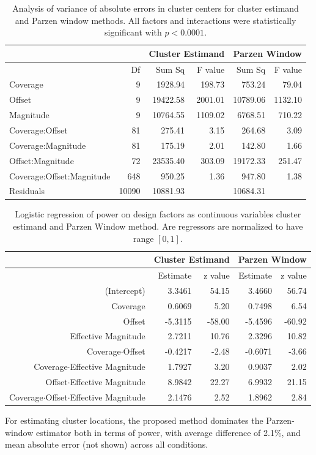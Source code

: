 \begin{table}
\centering{}%
\begin{tabular}{lr|rr|rr}
\hline 
 &  & \multicolumn{2}{c|}{Cluster Estimand} & \multicolumn{2}{c}{Parzen Window}\tabularnewline
\hline 
 & Df  & Sum Sq  & F value  & Sum Sq  & F value \tabularnewline
\hline 
Coverage & 9  & 1928.94  & 198.73  & 753.24  & 79.04 \tabularnewline
Offset  & 9  & 19422.58  & 2001.01  & 10789.06  & 1132.10 \tabularnewline
Magnitude  & 9  & 10764.55  & 1109.02 & 6768.51  & 710.22 \tabularnewline
Coverage:Offset  & 81  & 275.41  & 3.15 & 264.68  & 3.09 \tabularnewline
Coverage:Magnitude  & 81  & 175.19  & 2.01 & 142.80  & 1.66 \tabularnewline
Offset:Magnitude  & 72  & 23535.40  & 303.09 & 19172.33  & 251.47 \tabularnewline
Coverage:Offset:Magnitude  & 648  & 950.25  & 1.36  & 947.80  & 1.38 \tabularnewline
Residuals  & 10090  & 10881.93  &  & 10684.31  & \tabularnewline
\hline 
\end{tabular}\caption{Analysis of variance of absolute errors in cluster centers for cluster
estimand and Parzen window methods. All factors and interactions were
statistically significant with $p<0.0001$.
\label{tab:clusterAnova}}
\end{table}
%
\begin{table}[ht]
\centering{}%
\begin{tabular}{r|rr|rr}
\hline 
 & \multicolumn{2}{c|}{Cluster Estimand} & \multicolumn{2}{c}{Parzen Window}\tabularnewline
\hline 
 & Estimate  & z value  & Estimate  & z value \tabularnewline
\hline 
(Intercept)  & 3.3461  & 54.15  & 3.4660  & 56.74 \tabularnewline
Coverage & 0.6069  & 5.20  & 0.7498  & 6.54 \tabularnewline
Offset  & -5.3115  & -58.00  & -5.4596  & -60.92 \tabularnewline
Effective Magnitude  & 2.7211  & 10.76  & 2.3296  & 10.82 \tabularnewline
Coverage$\cdot$Offset  & -0.4217  & -2.48  & -0.6071  & -3.66 \tabularnewline
Coverage$\cdot$Effective Magnitude  & 1.7927  & 3.20  & 0.9037  & 2.02 \tabularnewline
Offset$\cdot$Effective Magnitude  & 8.9842  & 22.27  & 6.9932  & 21.15 \tabularnewline
Coverage$\cdot$Offset$\cdot$Effective Magnitude  & 2.1476  & 2.52  & 1.8962  & 2.84 \tabularnewline
\hline 
\end{tabular}\caption{Logistic regression of power on design factors as continuous variables
cluster estimand and Parzen Window method. Are regressors are normalized
to have range $[0,1]$.
\label{tab:clusterGlm}}
\end{table}
\fi
%
For estimating cluster locations, the proposed method dominates the Parzen-window estimator both in terms of power, with average difference of 2.1\%, and mean absolute error (not shown) across all conditions.
